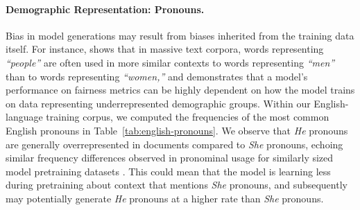 \paragraph{Demographic Representation: Pronouns.} Bias in model generations may result from biases inherited from the training data itself. For instance, \citet{bailey2022based} shows that in massive text corpora, words representing \textit{``people''} are often used in more similar contexts to words representing \textit{``men''} than to words representing \textit{``women,''} and \citet{ganesh2023impact} demonstrates that a model's performance on fairness metrics can be highly dependent on how the model trains on data representing underrepresented demographic groups. Within our English-language training corpus, we computed the frequencies of the most common English pronouns in Table~\ref{tab:english-pronouns}.
We observe that \textit{He} pronouns are generally overrepresented in documents compared to \textit{She} pronouns, echoing similar frequency differences observed in pronominal usage for similarly sized model pretraining datasets \citep{palm1}. This could mean that the model is learning less during pretraining about context that mentions \textit{She} pronouns, and subsequently may potentially generate \textit{He} pronouns at a higher rate than \textit{She} pronouns.


